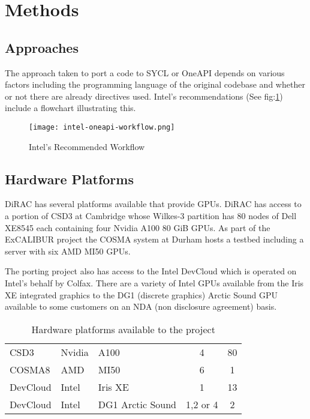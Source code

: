 \documentclass[main]{subfiles}
\begin{document}
\section{Methods}\label{sec:methods}
\subsection{Approaches}\label{sec:approaches}

The approach taken to port a code to SYCL or OneAPI\cite{intel_corp_oneapi_nodate} depends on various factors including the programming language of the original codebase and whether or not there are already directives used.
Intel's recommendations (See fig:\ref{fig:intel-workflow}) include a flowchart illustrating this.

\begin{figure}[htb]
	\caption{Intel's Recommended Workflow}
	\texttt{[image: intel-oneapi-workflow.png]}
	\label{fig:intel-workflow} %
\end{figure}

\subsection{Hardware Platforms}

DiRAC has several platforms available that provide GPUs.
DiRAC has access to a portion of CSD3 at Cambridge whose Wilkes-3 partition has 80 nodes of Dell XE8545 each containing four Nvidia A100 80 GiB GPUs.
As part of the ExCALIBUR project the COSMA system at Durham hosts a testbed including a server with six AMD MI50 GPUs.

The porting project also has access to the Intel DevCloud which is operated on Intel's behalf by Colfax.
There are a variety of Intel GPUs available from the Iris XE integrated graphics to the DG1 (discrete graphics) Arctic Sound GPU available to some customers on an NDA (non disclosure agreement) basis.

\begin{table}[!htbp]
	\centering
	\begin{tabular}{@{}lllcS@{}}
		\toprule
		 &  &  &  & {} \\
		\midrule
		CSD3            & Nvidia         & A100              & 4                 & 80                  \\
		COSMA8          & AMD            & MI50              & 6                 & 1                   \\
		DevCloud        & Intel          & Iris XE           & 1                 & 13                  \\
		DevCloud        & Intel          & DG1 Arctic Sound  & 1,2 or 4          & 2                   \\
		\bottomrule
	\end{tabular}
	\caption{Hardware platforms available to the project}
	\label{tab:GPUs} %
\end{table}
\end{document}
